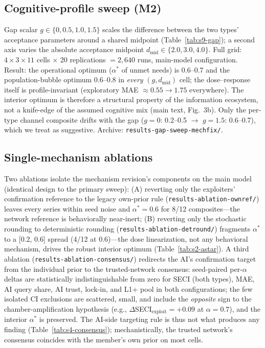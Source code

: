 \documentclass[11pt]{article}
\begin{document}
\subsection{Cognitive-profile sweep (M2)}
Gap scalar $g \in \{0, 0.5, 1.0, 1.5\}$ scales the difference between the
two types' acceptance parameters around a shared midpoint
(Table~\ref{tab:s9-gap}); a second axis varies the absolute acceptance
midpoint $d_{\mathrm{mid}} \in \{2.0, 3.0, 4.0\}$. Full grid: $4 \times 3
\times 11$ cells $\times$ 20 replications $= 2{,}640$ runs, main-model
configuration. Result: the operational optimum ($\alpha^{*}$ of unmet
needs) is 0.6--0.7 and the population-bubble optimum 0.6--0.8 in
\emph{every} $(g, d_{\mathrm{mid}})$ cell; the dose--response itself is
profile-invariant (exploratory MAE $\approx 0.55 \to 1.75$ everywhere).
The interior optimum is therefore a structural property of the
information ecosystem, not a knife-edge of the assumed cognitive mix
(main text, Fig.~3b). Only the per-type channel composite drifts with the
gap ($g=0$: 0.2--0.5 $\to$ $g=1.5$: 0.6--0.7), which we treat as
suggestive. Archive: \texttt{results-gap-sweep-mechfix/}.

\subsection{Single-mechanism ablations}
Two ablations isolate the mechanism revision's components on the main
model (identical design to the primary sweep): (A) reverting only the
exploiters' confirmation reference to the legacy own-prior rule
(\texttt{results-ablation-ownref/}) leaves every series within seed noise
and $\alpha^{*} = 0.6$ for 8/12 composites---the network reference is
behaviorally near-inert; (B) reverting only the stochastic rounding to
deterministic rounding (\texttt{results-ablation-detround/}) fragments
$\alpha^{*}$ to a [0.2, 0.6] spread (4/12 at 0.6)---the dose
linearization, not any behavioral mechanism, drives the robust interior
optimum (Table~\ref{tab:s2-astar}). A third ablation
(\texttt{results-ablation-consensus/}) redirects the AI's confirmation
target from the individual prior to the trusted-network consensus:
seed-paired per-$\alpha$ deltas are statistically indistinguishable from
zero for SECI (both types), MAE, AI query share, AI trust, lock-in, and
L1+ pool in both configurations; the few isolated CI exclusions are
scattered, small, and include the \emph{opposite} sign to the
chamber-amplification hypothesis (e.g., $\Delta$SECI$_{\mathrm{exploit}}
= +0.09$ at $\alpha = 0.7$), and the interior $\alpha^{*}$ is preserved.
The AI-side targeting rule is thus not what produces any finding
(Table~\ref{tab:s4-consensus}); mechanistically, the trusted network's
consensus coincides with the member's own prior on most cells.
\end{document}
